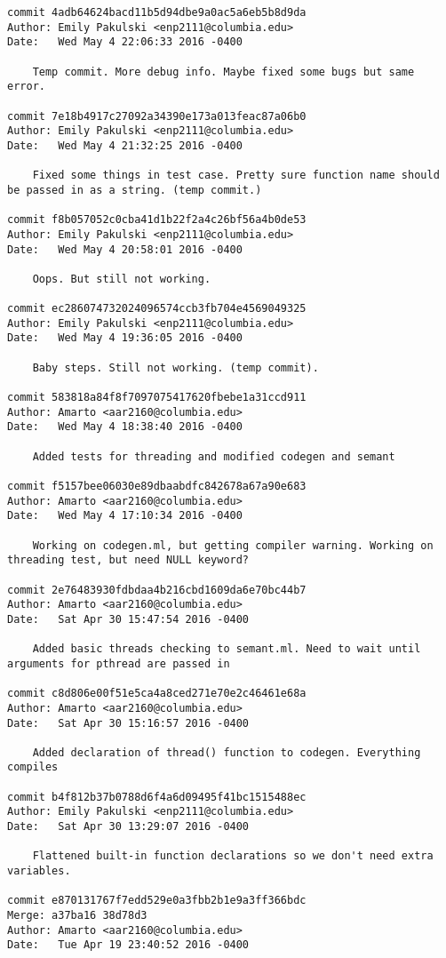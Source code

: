 \begin{lstlisting}[backgroundcolor=\color{white}]
commit 4adb64624bacd11b5d94dbe9a0ac5a6eb5b8d9da
Author: Emily Pakulski <enp2111@columbia.edu>
Date:   Wed May 4 22:06:33 2016 -0400

    Temp commit. More debug info. Maybe fixed some bugs but same error.

commit 7e18b4917c27092a34390e173a013feac87a06b0
Author: Emily Pakulski <enp2111@columbia.edu>
Date:   Wed May 4 21:32:25 2016 -0400

    Fixed some things in test case. Pretty sure function name should be passed in as a string. (temp commit.)

commit f8b057052c0cba41d1b22f2a4c26bf56a4b0de53
Author: Emily Pakulski <enp2111@columbia.edu>
Date:   Wed May 4 20:58:01 2016 -0400

    Oops. But still not working.

commit ec286074732024096574ccb3fb704e4569049325
Author: Emily Pakulski <enp2111@columbia.edu>
Date:   Wed May 4 19:36:05 2016 -0400

    Baby steps. Still not working. (temp commit).

commit 583818a84f8f7097075417620fbebe1a31ccd911
Author: Amarto <aar2160@columbia.edu>
Date:   Wed May 4 18:38:40 2016 -0400

    Added tests for threading and modified codegen and semant

commit f5157bee06030e89dbaabdfc842678a67a90e683
Author: Amarto <aar2160@columbia.edu>
Date:   Wed May 4 17:10:34 2016 -0400

    Working on codegen.ml, but getting compiler warning. Working on threading test, but need NULL keyword?

commit 2e76483930fdbdaa4b216cbd1609da6e70bc44b7
Author: Amarto <aar2160@columbia.edu>
Date:   Sat Apr 30 15:47:54 2016 -0400

    Added basic threads checking to semant.ml. Need to wait until arguments for pthread are passed in

commit c8d806e00f51e5ca4a8ced271e70e2c46461e68a
Author: Amarto <aar2160@columbia.edu>
Date:   Sat Apr 30 15:16:57 2016 -0400

    Added declaration of thread() function to codegen. Everything compiles

commit b4f812b37b0788d6f4a6d09495f41bc1515488ec
Author: Emily Pakulski <enp2111@columbia.edu>
Date:   Sat Apr 30 13:29:07 2016 -0400

    Flattened built-in function declarations so we don't need extra variables.

commit e870131767f7edd529e0a3fbb2b1e9a3ff366bdc
Merge: a37ba16 38d78d3
Author: Amarto <aar2160@columbia.edu>
Date:   Tue Apr 19 23:40:52 2016 -0400


\end{lstlisting}
